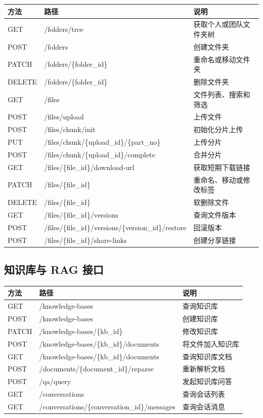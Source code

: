 \documentclass[a4paper,zihao=-4]{ctexart}
\begin{document}
\begin{longtable}{|>{\raggedright\arraybackslash}p{2.4cm}|>{\raggedright\arraybackslash}p{\dimexpr(\linewidth-2.4cm-6\tabcolsep-4\arrayrulewidth)/2\relax}|>{\raggedright\arraybackslash}p{\dimexpr(\linewidth-2.4cm-6\tabcolsep-4\arrayrulewidth)/2\relax}|}
\hline
方法 & 路径 & 说明\tabularnewline
\hline
\endhead
GET & /folders/tree & 获取个人或团队文件夹树\tabularnewline
\hline
POST & /folders & 创建文件夹\tabularnewline
\hline
PATCH & /folders/\{folder\_id\} & 重命名或移动文件夹\tabularnewline
\hline
DELETE & /folders/\{folder\_id\} & 删除文件夹\tabularnewline
\hline
GET & /files & 文件列表、搜索和筛选\tabularnewline
\hline
POST & /files/upload & 上传文件\tabularnewline
\hline
POST & /files/chunk/init & 初始化分片上传\tabularnewline
\hline
PUT & /files/chunk/\{upload\_id\}/\{part\_no\} & 上传分片\tabularnewline
\hline
POST & /files/chunk/\{upload\_id\}/complete & 合并分片\tabularnewline
\hline
GET & /files/\{file\_id\}/download-url & 获取短期下载链接\tabularnewline
\hline
PATCH & /files/\{file\_id\} & 重命名、移动或修改标签\tabularnewline
\hline
DELETE & /files/\{file\_id\} & 软删除文件\tabularnewline
\hline
GET & /files/\{file\_id\}/versions & 查询文件版本\tabularnewline
\hline
POST & /files/\{file\_id\}/versions/\{version\_id\}/restore & 回滚版本\tabularnewline
\hline
POST & /files/\{file\_id\}/share-links & 创建分享链接\tabularnewline
\hline
\end{longtable}

\hypertarget{ux77e5ux8bc6ux5e93ux4e0e-rag-ux63a5ux53e3}{%
\subsection{知识库与 RAG
接口}\label{ux77e5ux8bc6ux5e93ux4e0e-rag-ux63a5ux53e3}}

\begin{longtable}{|>{\raggedright\arraybackslash}p{2.4cm}|>{\raggedright\arraybackslash}p{\dimexpr(\linewidth-2.4cm-6\tabcolsep-4\arrayrulewidth)/2\relax}|>{\raggedright\arraybackslash}p{\dimexpr(\linewidth-2.4cm-6\tabcolsep-4\arrayrulewidth)/2\relax}|}
\hline
方法 & 路径 & 说明\tabularnewline
\hline
\endhead
GET & /knowledge-bases & 查询知识库\tabularnewline
\hline
POST & /knowledge-bases & 创建知识库\tabularnewline
\hline
PATCH & /knowledge-bases/\{kb\_id\} & 修改知识库\tabularnewline
\hline
POST & /knowledge-bases/\{kb\_id\}/documents & 将文件加入知识库\tabularnewline
\hline
GET & /knowledge-bases/\{kb\_id\}/documents & 查询知识库文档\tabularnewline
\hline
POST & /documents/\{document\_id\}/reparse & 重新解析文档\tabularnewline
\hline
POST & /qa/query & 发起知识库问答\tabularnewline
\hline
GET & /conversations & 查询会话列表\tabularnewline
\hline
GET & /conversations/\{conversation\_id\}/messages & 查询会话消息\tabularnewline
\hline
\end{longtable}
\end{document}

